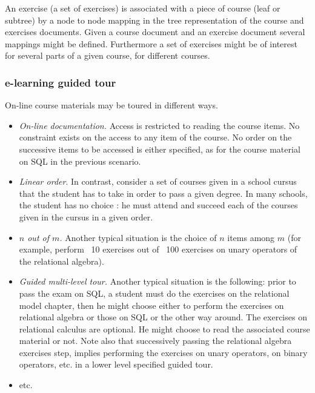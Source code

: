 An exercise (a set of exercises) is associated with a piece of course
(leaf or subtree) by a node to node mapping in the tree representation
of the course and exercises documents. Given a course document and an
exercise document 
several mappings might be defined. Furthermore a set of exercises
might be of interest for several parts of a given course, for
different courses.

\subsubsection*{e-learning guided tour}

On-line course materials may be toured in different ways.

\begin{itemize}

  \item \emph{On-line documentation.} Access is restricted to reading
  the course items. No constraint exists on the access to any item of
  the course. No order on the successive items to be accessed is
  either specified, as for the course material on SQL in the previous scenario.

  \item \emph{Linear order}. In contrast, consider a set of courses given in
  a school cursus that the student has to take in order to pass a
  given degree.  In many schools, the student has no choice : he
  must attend and succeed each of the courses given in the cursus in a
  given order.

  \item \emph{$n$ out of $m$.} Another typical situation is the choice
  of $n$ items among $m$ (for example, perform ~10  exercises out of
  ~100 exercises on unary operators of the relational algebra).

  \item \emph{Guided multi-level tour.} Another typical situation is
  the following: prior to pass the exam on SQL, a student must do
  the exercises on the relational model chapter, then he might choose
  either to perform the exercises on relational algebra or those on
  SQL or the other way around. The exercises on relational calculus
  are optional. He might choose to read the associated course material
  or not. Note also that successively passing the relational algebra
  exercises step, implies performing the exercises on unary operators,
  on binary operators, etc. in a lower level specified guided tour.

  \item etc.
\end{itemize}

